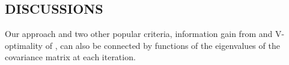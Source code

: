 
\subsection{DISCUSSIONS}


Our approach and two other popular criteria, information gain from \cite{srinivas2012information} and V-optimality of \cite{mingji}, can also be connected by functions of the eigenvalues of the covariance matrix at each iteration.





